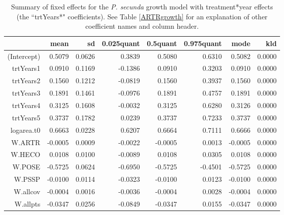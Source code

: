 \documentclass[11pt]{article}
\begin{document}


\begin{table}
\centering
\caption{Summary of fixed effects for the \textit{P. secunda} growth model with treatment*year effects (the ``trtYears*" coefficients). See Table \ref{ARTRgrowth} for an explanation of other coefficient names and column header.} 
\label{table:POSEgrowth-trtYears}
\begin{tabular}{rrrrrrrr}
  \hline
 & mean & sd & 0.025quant & 0.5quant & 0.975quant & mode & kld \\ 
  \hline
(Intercept) & 0.5079 & 0.0626 & 0.3839 & 0.5080 & 0.6310 & 0.5082 & 0.0000 \\ 
  trtYears1 & 0.0910 & 0.1169 & -0.1386 & 0.0910 & 0.3203 & 0.0910 & 0.0000 \\ 
  trtYears2 & 0.1560 & 0.1212 & -0.0819 & 0.1560 & 0.3937 & 0.1560 & 0.0000 \\ 
  trtYears3 & 0.1891 & 0.1461 & -0.0976 & 0.1891 & 0.4757 & 0.1891 & 0.0000 \\ 
  trtYears4 & 0.3125 & 0.1608 & -0.0032 & 0.3125 & 0.6280 & 0.3126 & 0.0000 \\ 
  trtYears5 & 0.3737 & 0.1782 & 0.0239 & 0.3737 & 0.7233 & 0.3737 & 0.0000 \\ 
  logarea.t0 & 0.6663 & 0.0228 & 0.6207 & 0.6664 & 0.7111 & 0.6666 & 0.0000 \\ 
  W.ARTR & -0.0005 & 0.0009 & -0.0022 & -0.0005 & 0.0013 & -0.0005 & 0.0000 \\ 
  W.HECO & 0.0108 & 0.0100 & -0.0089 & 0.0108 & 0.0305 & 0.0108 & 0.0000 \\ 
  W.POSE & -0.5725 & 0.0624 & -0.6950 & -0.5725 & -0.4501 & -0.5725 & 0.0000 \\ 
  W.PSSP & -0.0100 & 0.0114 & -0.0323 & -0.0100 & 0.0123 & -0.0100 & 0.0000 \\ 
  W.allcov & -0.0004 & 0.0016 & -0.0036 & -0.0004 & 0.0028 & -0.0004 & 0.0000 \\ 
  W.allpts & -0.0347 & 0.0256 & -0.0849 & -0.0347 & 0.0155 & -0.0347 & 0.0000 \\ 
   \hline
\end{tabular}
\end{table}
\end{document}
